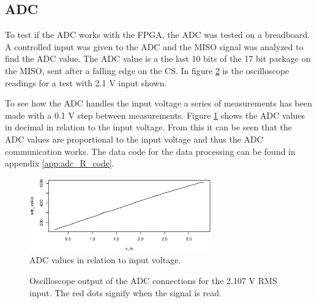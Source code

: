 \subsection{ADC}
To test if the ADC works with the FPGA, the ADC was tested on a breadboard.
A controlled input was given to the ADC and the MISO signal was analyzed to find the ADC value.
The ADC value is a the last 10 bits of the 17 bit package on the MISO, sent after a falling edge on the CS.
In figure \ref{fig:scope_adc} is the oscilloscope readings for a test with 2.1 V input shown.

To see how the ADC handles the input voltage a series of measurements has been made with a 0.1 V step between measurements.
Figure \ref{fig:adc_values} shows the ADC values in decimal in relation to the input voltage.
From this it can be seen that the ADC values are proportional to the input voltage and thus the ADC communication works.
The data code for the data processing can be found in appendix \ref{app:adc_R_code}.

\begin{figure}[ht]
 \centering
 \includegraphics[width=0.7\textwidth]{img/ADC_values}
 \caption{ADC values in relation to input voltage.}
 \label{fig:adc_values}
\end{figure}

\begin{figure}[ht]
    \centering
    \caption[Oscilloscope measurements for ADC]
            {Oscilloscope output of the ADC connections for the 2.107 V RMS input. The red dots signify when the signal is read.}
            \label{fig:scope_adc}
\end{figure}

